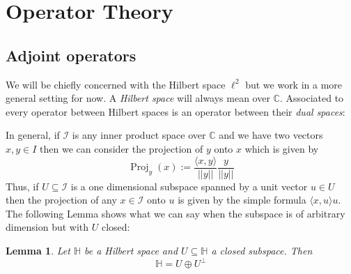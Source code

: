 \documentclass[12pt]{article}
\theoremstyle{plain}
\newtheorem{lemma}[thm]{Lemma}
\theoremstyle{definition}
\newcommand{\bb}[1]{\mathbb{#1}}
\newcommand{\call}[1]{\mathcal{#1}}
\begin{document}
\appendix

\section{Operator Theory}
\subsection{Adjoint operators}
We will be chiefly concerned with the Hilbert space $\ell^2$ but we work in a more general setting for now. A \emph{Hilbert space} will always mean over $\bb{C}$. Associated to every operator between Hilbert spaces is an operator between their \emph{dual spaces}:

In general, if $\call{I}$ is any inner product space over $\bb{C}$ and we have two vectors $x,y \in I$ then we can consider the projection of $y$ onto $x$ which is given by
\begin{equation}\label{eq:easy_case}
	\operatorname{Proj}_y(x) := \frac{\langle x, y \rangle}{||y||} \frac{y}{||y||}
\end{equation}
Thus, if $U \subseteq \call{I}$ is a one dimensional subspace spanned by a unit vector $u \in U$ then the projection of any $x \in \call{I}$ onto $u$ is given by the simple formula $\langle x,u\rangle u$. The following Lemma shows what we can say when the subspace is of arbitrary dimension but with $U$ closed:
\begin{lemma}\label{lem:decomposition}
	Let $\bb{H}$ be a Hilbert space and $U \subseteq \bb{H}$ a closed subspace. Then
	\[\bb{H} = U \oplus U^\perp\]
\end{lemma}
\end{document}
